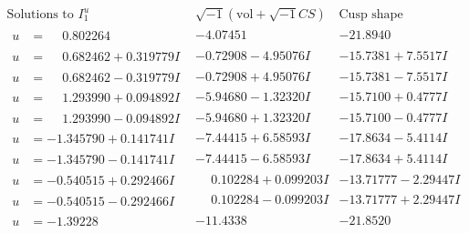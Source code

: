 \documentclass[1p]{elsarticle_modified}
\theoremstyle{definition}
\newcommand{\I}{\sqrt{-1}}
\begin{document}
$$\begin{array}{c|c|c}  
\text{Solutions to }I^u_{1}& \I (\text{vol} + \sqrt{-1}CS) & \text{Cusp shape}\\
 \hline 
\begin{aligned}
u &= \phantom{-}0.802264\phantom{ +0.000000I}\end{aligned}
 & -4.07451\phantom{ +0.000000I} & -21.8940\phantom{ +0.000000I} \\ \hline\begin{aligned}
u &= \phantom{-}0.682462 + 0.319779 I\end{aligned}
 & -0.72908 - 4.95076 I & -15.7381 + 7.5517 I \\ \hline\begin{aligned}
u &= \phantom{-}0.682462 - 0.319779 I\end{aligned}
 & -0.72908 + 4.95076 I & -15.7381 - 7.5517 I \\ \hline\begin{aligned}
u &= \phantom{-}1.293990 + 0.094892 I\end{aligned}
 & -5.94680 - 1.32320 I & -15.7100 + 0.4777 I \\ \hline\begin{aligned}
u &= \phantom{-}1.293990 - 0.094892 I\end{aligned}
 & -5.94680 + 1.32320 I & -15.7100 - 0.4777 I \\ \hline\begin{aligned}
u &= -1.345790 + 0.141741 I\end{aligned}
 & -7.44415 + 6.58593 I & -17.8634 - 5.4114 I \\ \hline\begin{aligned}
u &= -1.345790 - 0.141741 I\end{aligned}
 & -7.44415 - 6.58593 I & -17.8634 + 5.4114 I \\ \hline\begin{aligned}
u &= -0.540515 + 0.292466 I\end{aligned}
 & \phantom{-}0.102284 + 0.099203 I & -13.71777 - 2.29447 I \\ \hline\begin{aligned}
u &= -0.540515 - 0.292466 I\end{aligned}
 & \phantom{-}0.102284 - 0.099203 I & -13.71777 + 2.29447 I \\ \hline\begin{aligned}
u &= -1.39228\phantom{ +0.000000I}\end{aligned}
 & -11.4338\phantom{ +0.000000I} & -21.8520\phantom{ +0.000000I} \\ \hline\begin{aligned}

\end{aligned}
\end{array}$$
\end{document}
